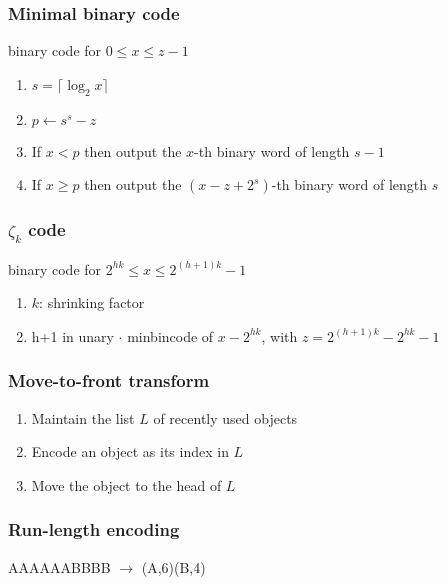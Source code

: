 \begin{frame}[fragile]
\frametitle{Minimal binary code}
\begin{block}{binary code for \(0\le x\le z-1\)}
\begin{enumerate}
\item
\(s = \lceil \log_{2}x \rceil\)
\item
      \(p \gets s^{s}-z\)
\item
      If \(x < p\) then output the \(x\)-th binary word of length \(s-1\)
\item
      If \(x \ge p\) then output the \((x-z+2^{s})\)-th binary word of length \(s\)
\end{enumerate}
\end{block}
\end{frame}

\begin{frame}[fragile]
\frametitle{\(\zeta_{k}\) code}
\begin{block}{binary code for \(2^{hk}\le x\le 2^{(h+1)k}-1\)}
\begin{enumerate}
\item
      \(k\): shrinking factor
\item
      h+1 in unary \(\cdot\) minbincode of \(x - 2^{hk}\), with
\(z = 2^{(h+1)k} - 2^{hk} -1\)
\end{enumerate}
\end{block}
\end{frame}

\begin{frame}[fragile]
\frametitle{Move-to-front transform}

\begin{enumerate}
\item
      Maintain the list \(L\) of recently used objects
\item
      Encode an object as its index in \(L\)
\item
      Move the object to the head of \(L\)
\end{enumerate}
\end{frame}



\begin{frame}[fragile]
\frametitle{Run-length encoding}

AAAAAABBBB \(\rightarrow\) (A,6)(B,4)

\end{frame}

